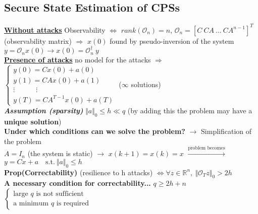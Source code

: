 \documentclass[a4paper, 12pt]{article}
\begin{document}
{\color{red} \subsection*{Secure State Estimation of CPSs \quad{}}} 
\underline{\textbf{Without attacks}} Observability $\iff$ $rank(\mathcal{O}_n)=n$, $\mathcal{O}_n=[C \ CA \ ... \ CA^{n-1}]^T$ (observability matrix) $\Rightarrow$ $x(0)$ found by pseudo-inversion of the system ${y=\mathcal{O}_nx(0)} \longrightarrow x(0)=\mathcal{O}_n^{\dagger} \ y$\\
\noindent
\underline{\textbf{Presence of attacks}} no model for the attacks $\Longrightarrow$ $\begin{cases}
    y(0)=Cx(0)+a(0)\\
    y(1)=CAx(0)+a(1)\\
    \vdots \quad \quad \quad \vdots\\
    y(T)=CA^{T-1}x(0)+a(T)
\end{cases}$ {\small($\infty$ solutions)}\\
\vspace{0.2cm}\noindent
\textit{\textbf{Assumption (sparsity)}} $\Vert a \Vert_0 \le h \ll q$ (by adding this the problem may have a \textbf{unique solution})\\
\noindent
{\color{blue} \textbf{Under which conditions can we solve the problem?} 
$\rightarrow$ Simplification of the problem}\\
$A=I_n$ (the system is static) $\longrightarrow$ $x(k+1)=x(k)=x$ 
$\overset{\text{problem becomes}}{\longrightarrow}$
$y=Cx+a \quad \text{s.t.} \ \Vert a \Vert_0 \le h$ \\
\textbf{Prop(Correctability)} (resilience to h attacks) $\iff \forall z \in \mathbb{R}^n, \  \Vert \mathcal{O}_Tz\Vert_0>2h$\\
\textbf{A necessary condition for correctability...} {\small{
    $q\ge 2h+n $ $\begin{cases}
        \text{large $q$ is not sufficient}\\
        \text{a minimum $q$ is required}
    \end{cases}$
}}\\
\end{document}
